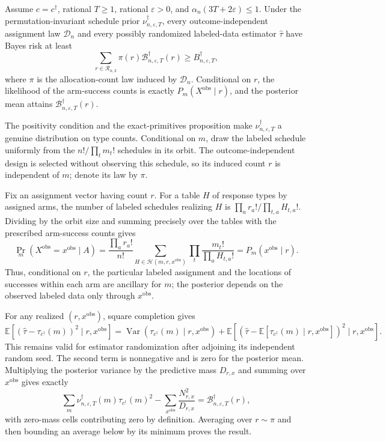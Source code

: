 Assume \(c=c^\dagger\), rational \(T\ge1\), rational \(\varepsilon>0\), and \(\alpha_n(3T+2\varepsilon)\le1\).  Under the permutation-invariant schedule prior \(\nu_{n,\varepsilon,T}^\dagger\), every outcome-independent assignment law \(\mathcal D_n\) and every possibly randomized labeled-data estimator \(\widehat\tau\) have Bayes risk at least
\[
\sum_{r\in\mathcal R_{n,3}}\pi(r)\mathcal B_{n,\varepsilon,T}^\dagger(r)
\ge B_{n,\varepsilon,T}^\dagger,
\]
where \(\pi\) is the allocation-count law induced by \(\mathcal D_n\).  Conditional on \(r\), the likelihood of the arm-success counts is exactly \(P_m(X^{\mathrm{obs}}\mid r)\), and the posterior mean attains \(\mathcal B_{n,\varepsilon,T}^\dagger(r)\).

The positivity condition and the exact-primitives proposition make \(\nu_{n,\varepsilon,T}^\dagger\) a genuine distribution on type counts.  Conditional on \(m\), draw the labeled schedule uniformly from the \(n!/\prod_tm_t!\) schedules in its orbit.  The outcome-independent design is selected without observing this schedule, so its induced count \(r\) is independent of \(m\); denote its law by \(\pi\).

Fix an assignment vector having count \(r\).  For a table \(H\) of response types by assigned arms, the number of labeled schedules realizing \(H\) is \(\prod_ar_a!/\prod_{t,a}H_{t,a}!\).  Dividing by the orbit size and summing precisely over the tables with the prescribed arm-success counts gives
\[
\Pr_m(X^{\mathrm{obs}}=x^{\mathrm{obs}}\mid A)
=\frac{\prod_ar_a!}{n!}
\sum_{H\in\mathcal H(m,r,x^{\mathrm{obs}})}
\prod_t\frac{m_t!}{\prod_aH_{t,a}!}
=P_m(x^{\mathrm{obs}}\mid r).
\]
Thus, conditional on \(r\), the particular labeled assignment and the locations of successes within each arm are ancillary for \(m\); the posterior depends on the observed labeled data only through \(x^{\mathrm{obs}}\).

For any realized \((r,x^{\mathrm{obs}})\), square completion gives
\[
\mathbb E[(\widehat\tau-\tau_{c^\dagger}(m))^2\mid r,x^{\mathrm{obs}}]
=\operatorname{Var}(\tau_{c^\dagger}(m)\mid r,x^{\mathrm{obs}})
+\mathbb E[(\widehat\tau-\mathbb E[\tau_{c^\dagger}(m)\mid r,x^{\mathrm{obs}}])^2
 \mid r,x^{\mathrm{obs}}].
\]
This remains valid for estimator randomization after adjoining its independent random seed.  The second term is nonnegative and is zero for the posterior mean.  Multiplying the posterior variance by the predictive mass \(D_{r,x}\) and summing over \(x^{\mathrm{obs}}\) gives exactly
\[
\sum_m\nu_{n,\varepsilon,T}^\dagger(m)\tau_{c^\dagger}(m)^2
-\sum_{x^{\mathrm{obs}}}\frac{N_{r,x}^2}{D_{r,x}}
=\mathcal B_{n,\varepsilon,T}^\dagger(r),
\]
with zero-mass cells contributing zero by definition.  Averaging over \(r\sim\pi\) and then bounding an average below by its minimum proves the result.


